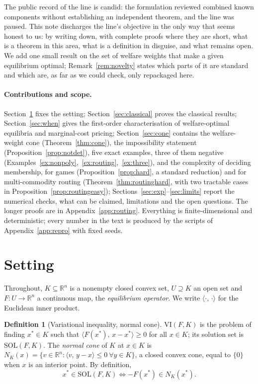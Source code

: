 \documentclass[11pt,a4paper]{article}
\theoremstyle{plain}
\theoremstyle{definition}
\newtheorem{definition}[theorem]{Definition}
\theoremstyle{remark}
\newcommand{\R}{\mathbb{R}}
\newcommand{\SOL}{\mathrm{SOL}}
\newcommand{\VI}{\mathrm{VI}}
\newcommand{\NC}{N}
\newcommand{\ip}[2]{\langle #1,\,#2\rangle}
\begin{document}
The public record of the line is candid: the formulation reviewed combined known components without establishing an independent theorem, and the line was paused. This note discharges the line's objective in the only way that seems honest to us: by writing down, with complete proofs where they are short, what is a theorem in this area, what is a definition in disguise, and what remains open. We add one small result on the set of welfare weights that make a given equilibrium optimal; Remark~\ref{rem:novelty} states which parts of it are standard and which are, as far as we could check, only repackaged here.

\paragraph{Contributions and scope.} Section~\ref{sec:setting} fixes the setting; Section~\ref{sec:classical} proves the classical results; Section~\ref{sec:when} gives the first-order characterisation of welfare-optimal equilibria and marginal-cost pricing; Section~\ref{sec:cone} contains the welfare-weight cone (Theorem~\ref{thm:cone}), the impossibility statement (Proposition~\ref{prop:notdet}), five exact examples, three of them negative (Examples~\ref{ex:nonpoly},~\ref{ex:routing},~\ref{ex:three}), and the complexity of deciding membership, for games (Proposition~\ref{prop:hard}, a standard reduction) and for multi-commodity routing (Theorem~\ref{thm:routinghard}, with two tractable cases in Proposition~\ref{prop:routingeasy}); Sections~\ref{sec:exp}--\ref{sec:limits} report the numerical checks, what can be claimed, limitations and the open questions. The longer proofs are in Appendix~\ref{app:routing}. Everything is finite-dimensional and deterministic; every number in the text is produced by the scripts of Appendix~\ref{app:repro} with fixed seeds.

\section{Setting}\label{sec:setting}

Throughout, $K\subseteq\R^n$ is a nonempty closed convex set, $U\supseteq K$ an open set and $F\colon U\to\R^n$ a continuous map, the \emph{equilibrium operator}. We write $\ip{\cdot}{\cdot}$ for the Euclidean inner product.

\begin{definition}[Variational inequality, normal cone]\label{def:vi}
$\VI(F,K)$ is the problem of finding $x^*\in K$ such that $\ip{F(x^*)}{x-x^*}\ge 0$ for all $x\in K$; its solution set is $\SOL(F,K)$. The \emph{normal cone} of $K$ at $x\in K$ is $\NC_K(x)=\{v\in\R^n:\ip{v}{y-x}\le 0\ \forall y\in K\}$, a closed convex cone, equal to $\{0\}$ when $x$ is an interior point. By definition,
\begin{equation}\label{eq:vi-normal}
x^*\in\SOL(F,K)\iff -F(x^*)\in\NC_K(x^*).
\end{equation}
\end{definition}
\end{document}
